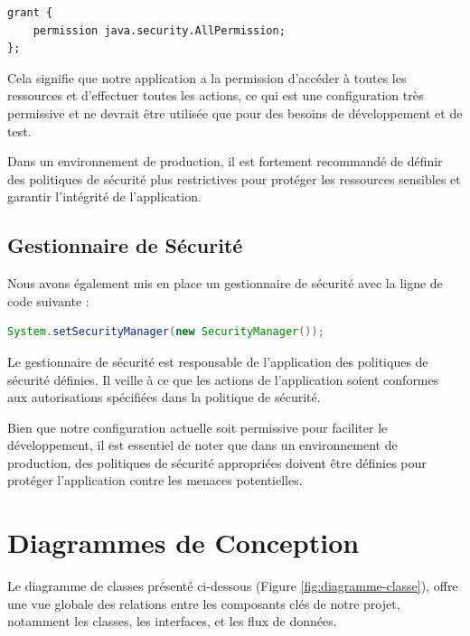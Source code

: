 \documentclass{article} %
\begin{document}
\begin{lstlisting}
grant {
    permission java.security.AllPermission;
};
\end{lstlisting}

Cela signifie que notre application a la permission d'accéder à toutes les ressources 
et d'effectuer toutes les actions, ce qui est une configuration très permissive et ne 
devrait être utilisée que pour des besoins de développement et de test.

Dans un environnement de production, il est fortement recommandé de définir des politiques de sécurité 
plus restrictives pour protéger les ressources sensibles et garantir l'intégrité de l'application.

\subsection{Gestionnaire de Sécurité}

Nous avons également mis en place un gestionnaire de sécurité avec la ligne de code suivante :

\begin{lstlisting}[language=Java]
System.setSecurityManager(new SecurityManager());
\end{lstlisting}

Le gestionnaire de sécurité est responsable de l'application des politiques de sécurité définies. 
Il veille à ce que les actions de l'application soient conformes aux autorisations spécifiées 
dans la politique de sécurité.

Bien que notre configuration actuelle soit permissive pour faciliter le développement, 
il est essentiel de noter que dans un environnement de production, des politiques de sécurité 
appropriées doivent être définies pour protéger l'application contre les menaces potentielles.

\newpage
\section{Diagrammes de Conception}

Le diagramme de classes présenté ci-dessous (Figure \ref{fig:diagramme-classe}), 
offre une vue globale des relations entre les composants clés de notre projet, 
notamment les classes, les interfaces, et les flux de données. 
\end{document}

